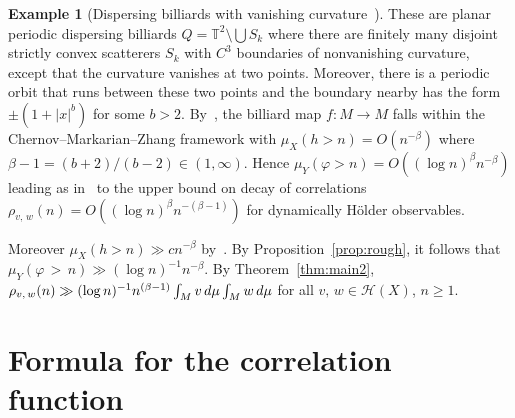 \documentclass[10pt]{amsart}
\theoremstyle{definition}\newtheorem{defi}[theo]{Definition}\newtheorem{rema}[theo]{Remark}\newtheorem{exam}[theo]{Example}\newtheorem{exem}[theo]{Example}\newtheorem{nota}[theo]{Notation}
\newcommand{\T}{\mathbb{T}}
\newcommand{\cH}{\mathcal{H}}
\begin{document}
\begin{exam}[Dispersing billiards with vanishing curvature~\cite{ChernovZhang05b}]
These are planar periodic dispersing billiards $Q=\T^2\setminus\bigcup S_k$ where there are finitely many disjoint strictly convex scatterers $S_k$ with $C^3$ boundaries of nonvanishing curvature, except that the curvature vanishes at two points. Moreover, there is a periodic orbit that runs between these two points and the boundary nearby has the form $\pm(1+|x|^b)$ for some $b>2$. By~\cite[Theorem~1]{ChernovZhang05b}, the billiard map $f:M\to M$ falls within the Chernov--Markarian--Zhang framework with $\mu_X(h>n)=O(n^{-\beta})$ where $\beta-1=(b+2)/(b-2)\in (1,\infty)$. Hence $\mu_Y(\varphi>n)=O((\log n)^\beta n^{-\beta})$ leading as in~\cite{Young99} to the upper bound on decay of correlations $\rho_{v,\,w}(n)=O((\log n)^\beta n^{-(\beta-1)})$ for dynamically H\"older observables.

Moreover $\mu_X(h>n)\gg cn^{-\beta}$ by~\cite[Proposition~2]{ChernovZhang05b}. By Proposition~\ref{prop:rough}, it follows that $\mu_Y(\varphi\,>\,n)\gg (\log n)^{-1}n^{-\beta}$. By Theorem~\ref{thm:main2}, $\rho_{v,\,w}(n)\gg (\log n)^{-1}n^{(\beta-1)}\linebreak\int_M v\,d\mu\int_M w\,d\mu$ for all $v,\,w\in \cH(X)$, $n\ge1$.
\end{exam}

\appendix

\section{Formula for the correlation function}\label{app:conv}
\end{document}
